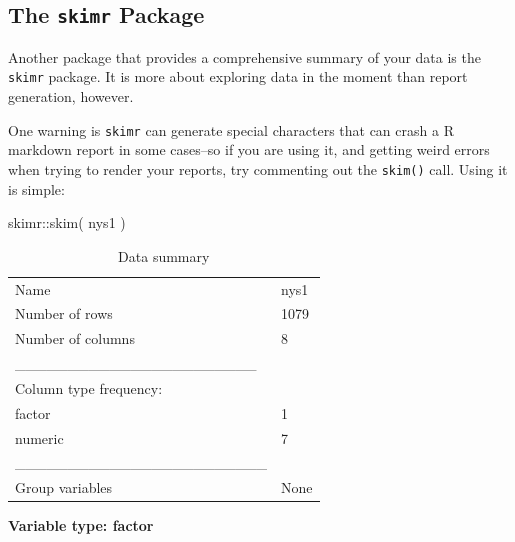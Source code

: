 \documentclass[
  letterpaper,
  DIV=11,
  numbers=noendperiod]{scrreprt}
\newenvironment{Shaded}{}{}
\newcommand{\FunctionTok}[1]{\textcolor[rgb]{0.02,0.16,0.49}{#1}}
\newcommand{\NormalTok}[1]{#1}
\newcommand{\SpecialCharTok}[1]{\textcolor[rgb]{0.25,0.44,0.63}{#1}}
\begin{document}
\subsection{\texorpdfstring{The \texttt{skimr}
Package}{The skimr Package}}\label{the-skimr-package}

Another package that provides a comprehensive summary of your data is
the \texttt{skimr} package. It is more about exploring data in the
moment than report generation, however.

One warning is \texttt{skimr} can generate special characters that can
crash a R markdown report in some cases--so if you are using it, and
getting weird errors when trying to render your reports, try commenting
out the \texttt{skim()} call. Using it is simple:

\begin{Shaded}
\begin{Highlighting}[]
\NormalTok{skimr}\SpecialCharTok{::}\FunctionTok{skim}\NormalTok{( nys1 )}
\end{Highlighting}
\end{Shaded}

\begin{longtable}[]{@{}ll@{}}
\caption{Data summary}\tabularnewline
\toprule\noalign{}
\endfirsthead
\endhead
\bottomrule\noalign{}
\endlastfoot
Name & nys1 \\
Number of rows & 1079 \\
Number of columns & 8 \\
\_\_\_\_\_\_\_\_\_\_\_\_\_\_\_\_\_\_\_\_\_\_\_ & \\
Column type frequency: & \\
factor & 1 \\
numeric & 7 \\
\_\_\_\_\_\_\_\_\_\_\_\_\_\_\_\_\_\_\_\_\_\_\_\_ & \\
Group variables & None \\
\end{longtable}

\textbf{Variable type: factor}
\end{document}
